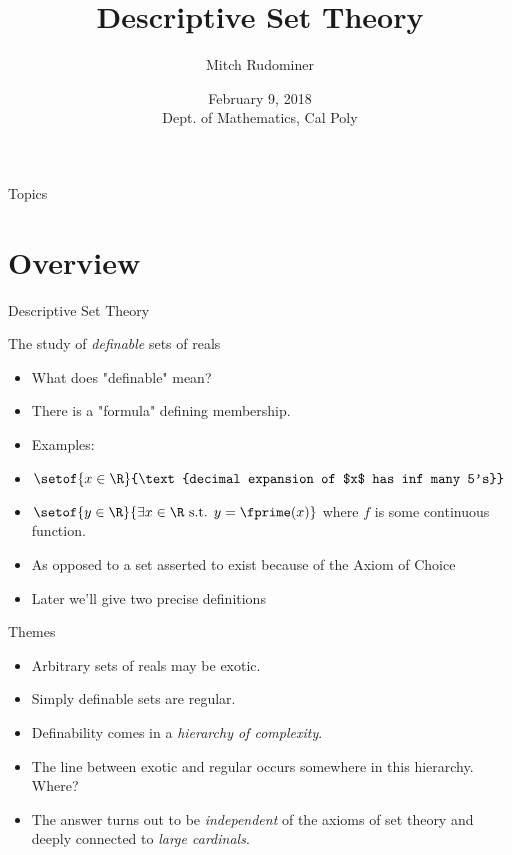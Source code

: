 \documentclass{beamer}
\title{Descriptive Set Theory}
\author{Mitch Rudominer}
\institute{Google}
\date
{February 9, 2018 \\ Dept. of Mathematics, Cal Poly }
\begin{document}
\begin{frame}
  \titlepage
\end{frame}

\begin{frame}{Topics}
  \tableofcontents
\end{frame}




\section{Overview}


\begin{frame}{Descriptive Set Theory}

The study of \emph{definable} sets of reals

\pause

  \begin{itemize}
  \item What does "definable" mean?
  \item There is a "formula" defining membership.
  \item Examples:
  \item $\setof{x\in\R}{\text{decimal expansion of $x$ has inf many 5's}}$
  \item $\setof{y\in\R}{\exists x\in\R \text{ s.t. } y=\fprime(x)}$ where $f$ is some continuous function.
  \item As opposed to a set asserted to exist because of the Axiom of Choice
  \item Later we'll give two precise definitions
  \end{itemize}


\end{frame}

\begin{frame}{Themes}

  \begin{itemize}
  \item Arbitrary sets of reals may be exotic.
  \item Simply definable sets are regular.
  \item Definability comes in a \emph{hierarchy of complexity}.
  \item The line between exotic and regular occurs somewhere in this
  hierarchy. Where?
  \item The answer turns out to be \emph{independent} of the axioms of set theory
  and deeply connected to \emph{large cardinals}.
  \end{itemize}
\end{frame}
\end{document}
